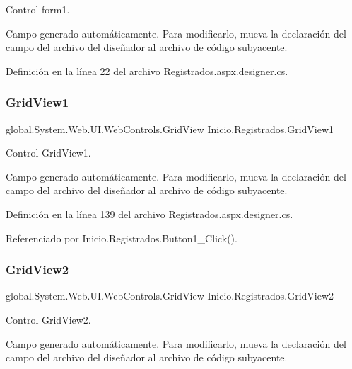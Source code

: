 Control form1. 

Campo generado automáticamente. Para modificarlo, mueva la declaración del campo del archivo del diseñador al archivo de código subyacente. 

Definición en la línea 22 del archivo Registrados.\+aspx.\+designer.\+cs.

\mbox{\label{classInicio_1_1Registrados_aad3adbb47738fefadfe5efa1dfb19b92}} 
\subsubsection{\texorpdfstring{GridView1}{GridView1}}
{\footnotesize\ttfamily global.\+System.\+Web.\+U\+I.\+Web\+Controls.\+Grid\+View Inicio.\+Registrados.\+Grid\+View1\hspace{0.3cm}{\ttfamily [protected]}}



Control Grid\+View1. 

Campo generado automáticamente. Para modificarlo, mueva la declaración del campo del archivo del diseñador al archivo de código subyacente. 

Definición en la línea 139 del archivo Registrados.\+aspx.\+designer.\+cs.



Referenciado por Inicio.\+Registrados.\+Button1\+\_\+\+Click().

\mbox{\label{classInicio_1_1Registrados_acf5a95ef87b37efcf6ad23cb0df13110}} 
\subsubsection{\texorpdfstring{GridView2}{GridView2}}
{\footnotesize\ttfamily global.\+System.\+Web.\+U\+I.\+Web\+Controls.\+Grid\+View Inicio.\+Registrados.\+Grid\+View2\hspace{0.3cm}{\ttfamily [protected]}}



Control Grid\+View2. 

Campo generado automáticamente. Para modificarlo, mueva la declaración del campo del archivo del diseñador al archivo de código subyacente. 

